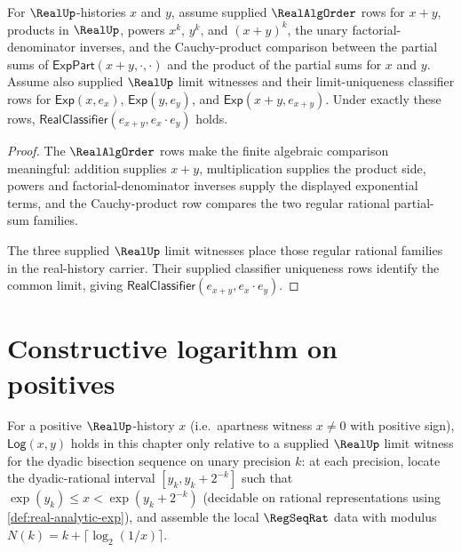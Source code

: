 \begin{theorem}
\label{thm:real-analytic-exp-add}
For $\RealUp$-histories $x$ and $y$, assume supplied $\RealAlgOrder$ rows for $x+y$, products in $\RealUp$, powers $x^k$, $y^k$, and $(x+y)^k$, the unary factorial-denominator inverses, and the Cauchy-product comparison between the partial sums of $\mathsf{ExpPart}(x+y,\cdot,\cdot)$ and the product of the partial sums for $x$ and $y$. Assume also supplied $\RealUp$ limit witnesses and their limit-uniqueness classifier rows for $\mathsf{Exp}(x,e_x)$, $\mathsf{Exp}(y,e_y)$, and $\mathsf{Exp}(x+y,e_{x+y})$. Under exactly these rows, $\mathsf{RealClassifier}(e_{x+y}, e_x \cdot e_y)$ holds.
\end{theorem}
\begin{proof}
The $\RealAlgOrder$ rows make the finite algebraic comparison meaningful: addition supplies $x+y$, multiplication supplies the product side, powers and factorial-denominator inverses supply the displayed exponential terms, and the Cauchy-product row compares the two regular rational partial-sum families.

The three supplied $\RealUp$ limit witnesses place those regular rational families in the real-history carrier. Their supplied classifier uniqueness rows identify the common limit, giving $\mathsf{RealClassifier}(e_{x+y}, e_x \cdot e_y)$.
\end{proof}

\section{Constructive logarithm on positives}
\label{sec:real-analytic-log}

\begin{definition}
\label{def:real-analytic-log}
For a positive $\RealUp$-history $x$ (i.e.\ apartness witness $x \neq 0$ with positive sign), $\mathsf{Log}(x, y)$ holds in this chapter only relative to a supplied $\RealUp$ limit witness for the dyadic bisection sequence on unary precision $k$: at each precision, locate the dyadic-rational interval $[y_k, y_k + 2^{-k}]$ such that $\exp(y_k) \leq x < \exp(y_k + 2^{-k})$ (decidable on rational representations using \autoref{def:real-analytic-exp}), and assemble the local $\RegSeqRat$ data with modulus $N(k) = k + \lceil \log_2(1/x) \rceil$.
\end{definition}

